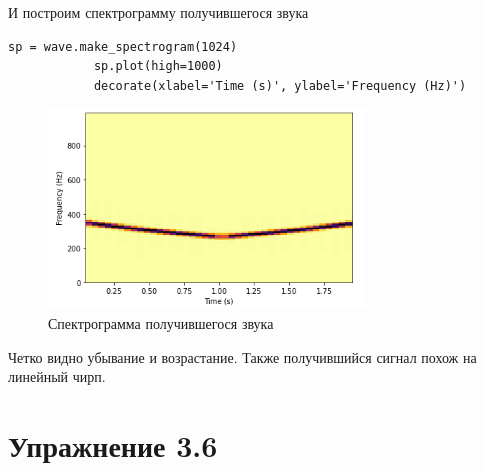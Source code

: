 \documentclass[a4paper,12pt]{article}
\begin{document}
\begin{enumerate}
		И построим спектрограмму получившегося звука
		\begin{lstlisting}[caption=Создание спектрограммы получившегося звука]
			sp = wave.make_spectrogram(1024)
			sp.plot(high=1000)
			decorate(xlabel='Time (s)', ylabel='Frequency (Hz)')
		\end{lstlisting}
		\begin{figure}[H]
			\centering
			\includegraphics[width=0.75\textwidth]{5_1.png}
			\caption{Спектрограмма получившегося звука}
			\label{fig:5.1}
		\end{figure}
		
		Четко видно убывание и возрастание. Также получившийся сигнал похож на линейный чирп.
		
	\end{enumerate}
	
	\newpage
	
	\section{Упражнение 3.6}
	
\end{document}
